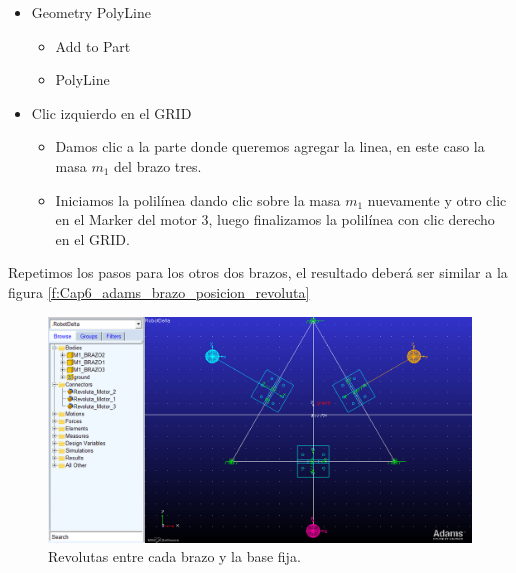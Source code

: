         \begin{scope}
            \renewcommand{\labelitemi}{\blacklozenge}
            \renewcommand{\labelitemii}{\checkmark}
            \begin{itemize}
                \item Geometry PolyLine
                \begin{itemize}
                    \item Add to Part
                    \item PolyLine
                \end{itemize}
                \item Clic izquierdo en el GRID
                \begin{itemize}
                    \item Damos clic a la parte donde queremos agregar la linea, en este caso la masa $m_{1}$ del brazo tres.
                    \item Iniciamos la polilínea dando clic sobre la masa $m_{1}$ nuevamente y otro clic en el Marker del motor 3, luego finalizamos la polilínea con clic derecho en el GRID.
                \end{itemize}
            \end{itemize}
        \end{scope}
        
        Repetimos los pasos para los otros dos brazos, el resultado deberá ser similar a la figura \eqref{f:Cap6_adams_brazo_posicion_revoluta}
        
        \begin{figure}[h]
            \centering
            \includegraphics[width=1\linewidth]{Main/Chapter6/Images6/adams/brazo/posicion_revoluta.png}
            \caption{Revolutas entre cada brazo y la base fija.}
            \label{f:Cap6_adams_brazo_posicion_revoluta}
        \end{figure}
        

